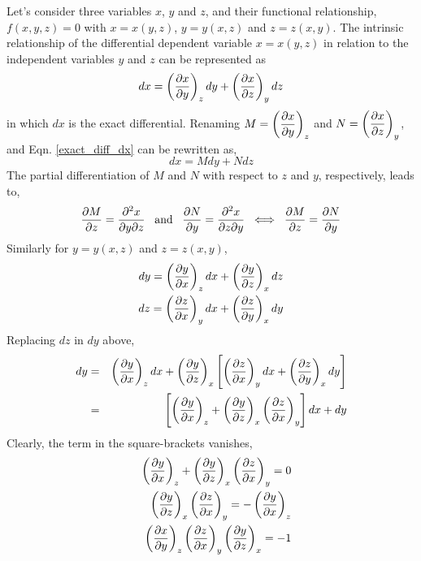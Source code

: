 Let's consider three variables $x$, $y$ and $z$, and their functional relationship, $f\left(x,y,z\right)=0$ with $x=x(y,z)$, $y=y(x,z)$ and $z=z(x,y)$.  The intrinsic relationship of the differential dependent variable $x=x(y,z)$ in relation to the independent variables $y$ and $z$ can be represented as
\begin{equation}
dx = \left(\displaystyle\frac{\partial x}{\partial y}\right)_{z}dy + \left(\displaystyle\frac{\partial x}{\partial z}\right)_{y}dz
\label{exact_diff_dx}
\end{equation}
\noindent
in which $dx$ is the exact differential. Renaming $M=\left(\displaystyle\frac{\partial x}{\partial y}\right)_{z}$ and $N=\left(\displaystyle\frac{\partial x}{\partial z}\right)_{y}$, and Eqn. \ref{exact_diff_dx} can be rewritten as,
\begin{equation}
dx = Mdy + Ndz \label{diff1}
\end{equation}
\noindent
The partial differentiation of $M$ and $N$ with respect to $z$ and $y$, respectively, leads to,
\begin{equation}
  \displaystyle\frac{\partial M}{\partial z}=\displaystyle\frac{\partial^{2} x}{\partial y \partial z} \;\;\;\text{and}\;\;\; \displaystyle\frac{\partial N}{\partial y}=\displaystyle\frac{\partial^{2} x}{\partial z \partial y} \;\; \Longleftrightarrow \;\;  \displaystyle\frac{\partial M}{\partial z}=\displaystyle\frac{\partial N}{\partial y} \label{diff2}
\end{equation}
\noindent
Similarly for $y=y(x,z)$ and $z=z(x,y)$, 
\begin{eqnarray}
  dy = \left(\displaystyle\frac{\partial y}{\partial x}\right)_{z}dx + \left(\displaystyle\frac{\partial y}{\partial z}\right)_{x}dz \nonumber \\
  dz = \left(\displaystyle\frac{\partial z}{\partial x}\right)_{y}dx + \left(\displaystyle\frac{\partial z}{\partial y}\right)_{x}dy \nonumber
\end{eqnarray}
\noindent
Replacing $dz$ in $dy$ above,
\begin{eqnarray}
dy &=& \left(\frc{\partial y}{\partial x}\right)_{z}dx +  \left(\frc{\partial y}{\partial z}\right)_{x} \left[ \left(\frc{\partial z}{\partial x}\right)_{y}dx + \left(\frc{\partial z}{\partial y}\right)_{x}dy \right] \nonumber \\
%
  &=& \left[ \left(\frc{\partial y}{\partial x}\right)_{z} + \left(\frc{\partial y}{\partial z}\right)_{x} \left(\frc{\partial z}{\partial x}\right)_{y} \right]dx + dy \nonumber 
\end{eqnarray}
\noindent
Clearly, the term in the square-brackets vanishes,
\begin{eqnarray}
&& \left(\frc{\partial y}{\partial x}\right)_{z} + \left(\frc{\partial y}{\partial z}\right)_{x} \left(\frc{\partial z}{\partial x}\right)_{y}  = 0 \nonumber \\
%
&& \left(\frc{\partial y}{\partial z}\right)_{x} \left(\frc{\partial z}{\partial x}\right)_{y} =  -\left(\frc{\partial y}{\partial x}\right)_{z} \nonumber \\
&&  \left(\frc{\partial x}{\partial y}\right)_{z} \left(\frc{\partial z}{\partial x}\right)_{y} \left(\frc{\partial y}{\partial z}\right)_{x} = -1 \label{diff3}
\end{eqnarray}
